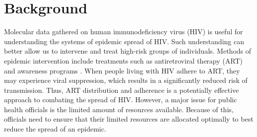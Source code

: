\documentclass[twocolumn]{bmcart}%
\begin{document}
%

\section*{Background}
Molecular data gathered on human immunodeficiency virus (HIV) is useful for understanding the systems of epidemic spread of HIV. Such understanding can better allow us to intervene and treat high-risk groups of individuals. Methods of epidemic intervention include treatments such as antiretroviral therapy (ART) and awareness programs \cite{cdc2}. When people living with HIV adhere to ART, they may experience viral suppression, which results in a significantly reduced risk of transmission. Thus, ART distribution and adherence is a potentially effective approach to combating the spread of HIV. However, a major issue for public health officials is the limited amount of resources available. Because of this, officials need to ensure that their limited resources are  allocated optimally to best reduce the spread of an epidemic.
\end{document}
